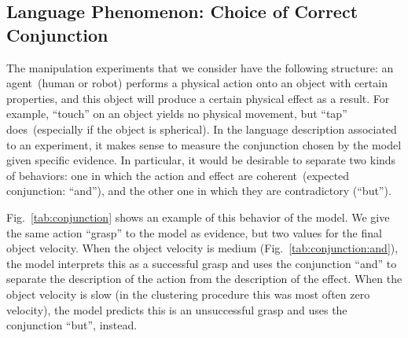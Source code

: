 \subsection{Language Phenomenon: Choice of Correct Conjunction}

\newcommand{\evidenceProducingAnd}{$\xobs=$\{ Action=grasp, ObjVel=medium \}}
\newcommand{\evidenceProducingBut}{$\xobs=$\{ Action=grasp, ObjVel=slow \}}

The manipulation experiments that we consider have the following structure: an agent~(human or robot) performs a physical action onto an object with certain properties, and this object will produce a certain physical effect as a result.
For example, ``touch'' on an object yields no physical movement, but ``tap'' does~(especially if the object is spherical).
In the language description associated to an experiment, it makes sense to measure the conjunction chosen by the model given specific evidence.
In particular, it would be desirable to separate two kinds of behaviors: one in which the action and effect are coherent~(expected conjunction: ``and''), and the other one in which they are contradictory (``but'').

Fig.~\ref{tab:conjunction} shows an example of this behavior of the model.
We give the same action ``grasp'' to the model as evidence, but two values for the final object velocity.
When the object velocity is medium (Fig.~\ref{tab:conjunction:and}), the model interprets this as a successful grasp and uses the conjunction ``and'' to separate the description of the action from the description of the effect.
When the object velocity is slow (in the clustering procedure this was most often zero velocity), the model predicts this is an unsuccessful grasp and uses the conjunction ``but'', instead.


